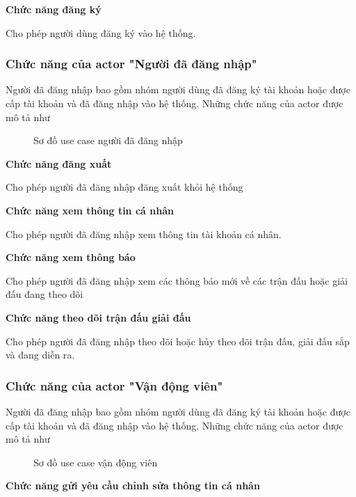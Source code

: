 \noindent
\textbf{Chức năng đăng ký}

Cho phép người dùng đăng ký vào hệ thống.

\subsubsection{Chức năng của actor "Người đã đăng nhập"}
Người đã đăng nhập bao gồm nhóm người dùng đã đăng ký tài khoản hoặc được cấp tài khoản và đã đăng nhập vào hệ thống.
Những chức năng của actor được mô tả như

\begin{figure}[H]
  \centering
  
  \caption{Sơ đồ use case người đã đăng nhập}
  \label{fig:uc-3}
\end{figure}

\noindent
\textbf{Chức năng đăng xuất}

Cho phép người đã đăng nhập đăng xuất khỏi hệ thống

\noindent
\textbf{Chức năng xem thông tin cá nhân}

Cho phép người đã đăng nhập xem thông tin tài khoản cá nhân.

\noindent
\textbf{Chức năng xem thông báo}

Cho phép người đã đăng nhập xem các thông báo mới về các trận đấu hoặc giải đấu đang theo dõi

\noindent
\textbf{Chức năng theo dõi trận đấu giải đấu}

Cho phép người đã đăng nhập theo dõi hoặc hủy theo dõi trận đấu, giải đấu sắp và đang diễn ra.



\subsubsection{Chức năng của actor "Vận động viên"}
Người đã đăng nhập bao gồm nhóm người dùng đã đăng ký tài khoản hoặc được cấp tài khoản và đã đăng nhập vào hệ thống.
Những chức năng của actor được mô tả như

\begin{figure}[H]
  \centering
  
  \caption{Sơ đồ use case vận động viên}
  \label{fig:uc-4}
\end{figure}


\noindent
\textbf{Chức năng gửi yêu cầu chỉnh sửa thông tin cá nhân}

